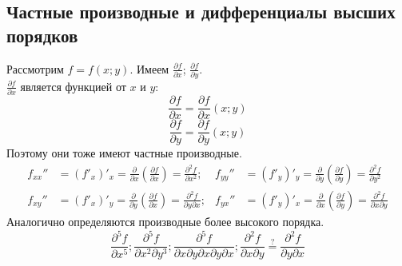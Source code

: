 \documentclass[12pt]{article}
\begin{document}
    \subsection{Частные производные и дифференциалы высших порядков}\noindent
    Рассмотрим $f = f(x;y)$. Имеем $\frac{\partial f}{\partial x}$; $\frac{\partial f}{\partial y}$.\\
    $\frac{\partial f}{\partial x}$ является функцией от $x$ и $y$: 
    \[ \frac{\partial f}{\partial x} = \frac{\partial f}{\partial x} (x; y) \]
    \[ \frac{\partial f}{\partial y} = \frac{\partial f}{\partial y} (x; y) \]
    Поэтому они тоже имеют частные производные.
    \begin{align*}
        f_{xx}'' &= (f'_x)'_x = \frac{\partial }{\partial x} \left( \frac{\partial f}{\partial x} \right) = \frac{\partial^2 f}{\partial x^2}; & f_{yy}'' &= (f'_y)'_y = \frac{\partial }{\partial y} \left( \frac{\partial f}{\partial y} \right) = \frac{\partial^2 f}{\partial y^2}\\
        f_{xy}'' &= (f'_x)'_y = \frac{\partial }{\partial y} \left( \frac{\partial f}{\partial x} \right) = \frac{\partial^2 f}{\partial y \partial x}; & f_{yx}'' &= (f'_y)'_x = \frac{\partial }{\partial x} \left( \frac{\partial f}{\partial y} \right) = \frac{\partial^2 f}{\partial x \partial y}
    \end{align*} 
    Аналогично определяются производные более высокого порядка.
    \[ \frac{\partial^5 f}{\partial x^5}; \frac{\partial^5 f}{\partial x^2 \partial y^3}; \frac{\partial^5 f}{\partial x \partial y \partial x \partial y \partial x}; \frac{\partial^2 f}{\partial x \partial y} \overset{?}{=} \frac{\partial^2 f}{\partial y \partial x} \]
\end{document}
